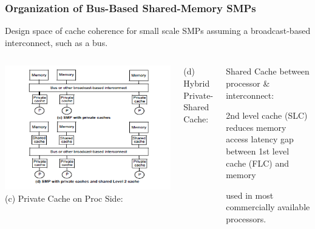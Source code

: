 \documentclass{beamer}
\renewcommand{\emph}[1]{\textcolor{structure}{#1}}
\newcommand{\emp}[1]{\textcolor{DikuRed}{ #1}}
\begin{document}
\begin{frame}[fragile,t]
\frametitle{Organization of Bus-Based Shared-Memory SMPs}

Design space of cache coherence for small scale SMPs 
assuming a broadcast-based interconnect, such as a bus.

\begin{columns}\hspace{-10ex}
\includegraphics[width=50ex]{FigsInfCoherence/PrivCachSMP}
\pause
        \emp{(c) Private Cache on Proc Side}:
\bigskip
\bigskip
\bigskip

        \emph{(d) Hybrid Private-Shared Cache}:
        \begin{itemize}
        \begin{scriptsize}
            \item \emp{Shared Cache} between processor \& interconnect:
            \item 2nd level cache (SLC) reduces memory access latency gap
                    between 1st level cache (FLC) and memory
            \item used in most commercially available processors.
        \end {scriptsize}
        \end  {itemize}
\end{columns}

\end{frame}
\end{document}
